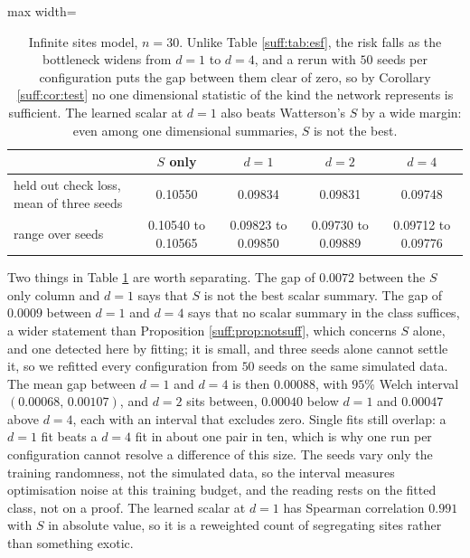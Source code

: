 \begin{table}[t]
\centering
\begin{adjustbox}{max width=\textwidth}
\begin{tabular}{lcccc}
\toprule
& $S$ only & $d=1$ & $d=2$ & $d=4$ \\
\midrule
held out check loss, mean of three seeds & 0.10550 & 0.09834 & 0.09831 & 0.09748 \\
range over seeds & 0.10540 to 0.10565 & 0.09823 to 0.09850 & 0.09730 to 0.09889 & 0.09712 to 0.09776 \\
\bottomrule
\end{tabular}
\end{adjustbox}
\caption{Infinite sites model, $n=30$. Unlike Table \ref{suff:tab:esf}, the risk falls as the
bottleneck widens from $d=1$ to $d=4$, and a rerun with $50$ seeds per configuration puts the
gap between them clear of zero, so by Corollary \ref{suff:cor:test} no one dimensional statistic of the kind the
network represents is sufficient. The learned scalar at $d=1$ also beats Watterson's $S$
by a wide margin: even among one dimensional summaries, $S$ is not the best.}
\label{suff:tab:sites}
\end{table}

Two things in Table \ref{suff:tab:sites} are worth separating. The gap of $0.0072$ between the
$S$ only column and $d=1$ says that $S$ is not the best scalar summary. The gap of $0.0009$
between $d=1$ and $d=4$ says that no scalar summary in the class suffices, a wider statement than Proposition \ref{suff:prop:notsuff}, which concerns $S$ alone, and one detected here by fitting; it is small, and three seeds alone cannot settle it, so we refitted every configuration from $50$ seeds on the same simulated data. The mean gap between $d=1$ and $d=4$ is then $0.00088$, with $95\%$ Welch interval $(0.00068,\,0.00107)$, and $d=2$ sits between, $0.00040$ below $d=1$ and $0.00047$ above $d=4$, each with an interval that excludes zero. Single fits still overlap: a $d=1$ fit beats a $d=4$ fit in about one pair in ten, which is why one run per configuration cannot resolve a difference of this size. The seeds vary only the training randomness, not the simulated data, so the interval measures optimisation noise at this training budget, and the reading rests on the fitted class, not on a proof.
The learned scalar at $d=1$ has Spearman correlation $0.991$ with $S$ in absolute value, so it
is a reweighted count of segregating sites rather than something exotic.


